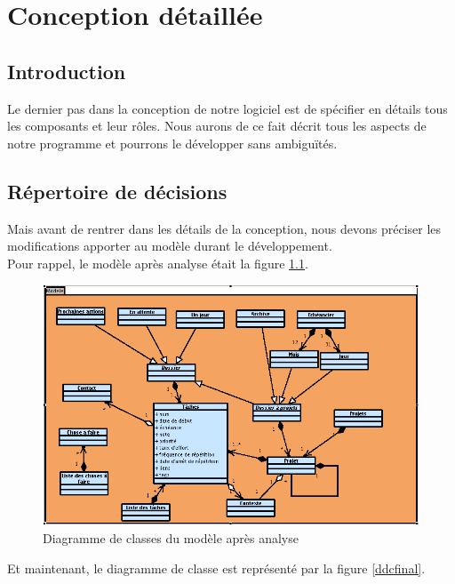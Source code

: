 \chapter{Conception détaillée}

\section*{Introduction}
Le dernier pas dans la conception de notre logiciel est de spécifier en détails tous les composants et leur rôles. Nous aurons de ce fait décrit tous les aspects de notre programme et pourrons le développer sans ambiguïtés.

\section{Répertoire de décisions}

Mais avant de rentrer dans les détails de la conception, nous devons préciser les modifications apporter au modèle durant le développement.\\
Pour rappel, le modèle après analyse était la figure \ref{ddcanalyse}.

\begin{figure}[!ht]
\begin{center}
\includegraphics[width=12cm]{images/DiagrammedeClasse.png}
\caption{Diagramme de classes du modèle après analyse}
\label{ddcanalyse}
\end{center}
\end{figure}

Et maintenant, le diagramme de classe est représenté par la figure \ref{ddcfinal}.

